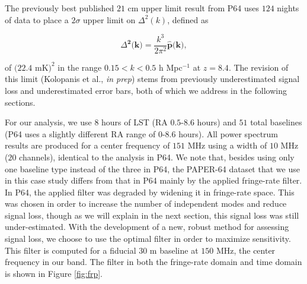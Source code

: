 \documentclass[preprint2,numberedappendix,tighten]{aastex6}  %
\begin{document}
The previously best published $21$ cm upper limit result from P64 uses $124$ nights of data to place a $2\sigma$ upper limit 
on $\Delta^{2}(k)$, defined as

\begin{equation}
\Delta^{\textbf{2}}\textbf{(k)} = \frac{k^{3}}{2\pi^{2}}\hat{\textbf{p}}\textbf{(k)},
\end{equation}

\noindent of $(22.4$ mK$)^{2}$ in the range $0.15 < k < 0.5$ h Mpc$^{-1}$ at $z = 8.4$. The revision of this limit (Kolopanis et al., \textit{in prep}) stems from previously underestimated signal loss and underestimated error bars, both of which we 
address in the following sections. 

For our analysis, we use $8$ hours of LST (RA $0.5$-$8.6$ hours) and $51$ total baselines (P64 uses a slightly different RA 
range of $0$-$8.6$ hours). All power spectrum results are produced for a center frequency of $151$ MHz using a width of $10$ 
MHz ($20$ channels), identical to the analysis in P64. We note that, besides using only one baseline type instead of the three in 
P64, the PAPER-64 dataset that we use in this case study differs from that in P64 mainly by the applied fringe-rate filter. In P64, the 
applied filter was degraded by widening it in fringe-rate space. This was chosen in order to increase the number of independent 
modes and reduce signal loss, though as we will explain in the next section, this signal loss was still under-estimated. With the development of a new, 
robust method for assessing signal loss, we choose to use the optimal filter in order to maximize sensitivity. This filter is 
computed for a fiducial $30$ m baseline at $150$ MHz, the center frequency in our band. The filter in both the fringe-rate 
domain and time domain is shown in Figure \ref{fig:frp}.
\end{document}
